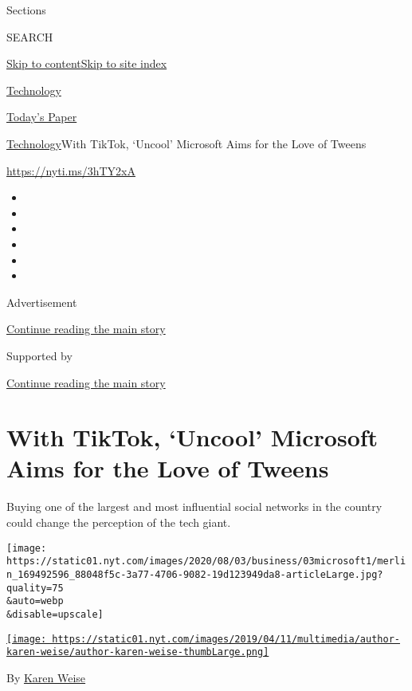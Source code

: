Sections

SEARCH

\protect\hyperlink{site-content}{Skip to
content}\protect\hyperlink{site-index}{Skip to site index}

\href{https://www.nytimes.com/section/technology}{Technology}

\href{https://myaccount.nytimes.com/auth/login?response_type=cookie\&client_id=vi}{}

\href{https://www.nytimes.com/section/todayspaper}{Today's Paper}

\href{/section/technology}{Technology}\textbar{}With TikTok, `Uncool'
Microsoft Aims for the Love of Tweens

\url{https://nyti.ms/3hTY2xA}

\begin{itemize}
\item
\item
\item
\item
\item
\item
\end{itemize}

Advertisement

\protect\hyperlink{after-top}{Continue reading the main story}

Supported by

\protect\hyperlink{after-sponsor}{Continue reading the main story}

\hypertarget{with-tiktok-uncool-microsoft-aims-for-the-love-of-tweens}{%
\section{With TikTok, `Uncool' Microsoft Aims for the Love of
Tweens}\label{with-tiktok-uncool-microsoft-aims-for-the-love-of-tweens}}

Buying one of the largest and most influential social networks in the
country could change the perception of the tech giant.

\texttt{[image: https://static01.nyt.com/images/2020/08/03/business/03microsoft1/merlin\_169492596\_88048f5c-3a77-4706-9082-19d123949da8-articleLarge.jpg?quality=75\\\&auto=webp\\\&disable=upscale]}

\href{https://www.nytimes.com/by/karen-weise}{\texttt{[image: https://static01.nyt.com/images/2019/04/11/multimedia/author-karen-weise/author-karen-weise-thumbLarge.png]}}

By \href{https://www.nytimes.com/by/karen-weise}{Karen Weise}

